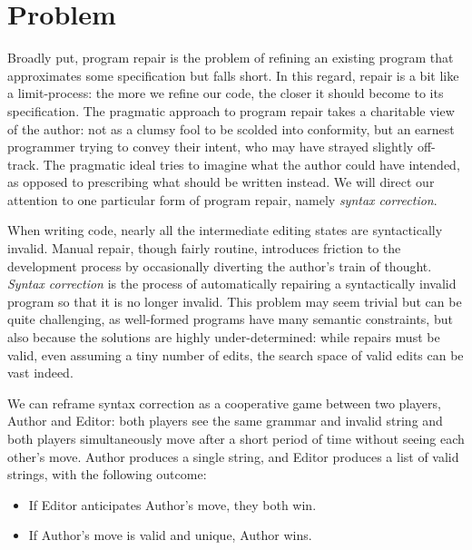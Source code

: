 \documentclass[sigplan,screen]{acmart}
\begin{document}
\section{Problem}


Broadly put, program repair is the problem of refining an existing program that approximates some specification but falls short. In this regard, repair is a bit like a limit-process: the more we refine our code, the closer it should become to its specification. The pragmatic approach to program repair takes a charitable view of the author: not as a clumsy fool to be scolded into conformity, but an earnest programmer trying to convey their intent, who may have strayed slightly off-track. The pragmatic ideal tries to imagine what the author could have intended, as opposed to prescribing what should be written instead. We will direct our attention to one particular form of program repair, namely \emph{syntax correction}.

When writing code, nearly all the intermediate editing states are syntactically invalid. Manual repair, though fairly routine, introduces friction to the development process by occasionally diverting the author's train of thought. \textit{Syntax correction} is the process of automatically repairing a syntactically invalid program so that it is no longer invalid. This problem may seem trivial but can be quite challenging, as well-formed programs have many semantic constraints, but also because the solutions are highly under-determined: while repairs must be valid, even assuming a tiny number of edits, the search space of valid edits can be vast indeed.

We can reframe syntax correction as a cooperative game between two players, Author and Editor: both players see the same grammar and invalid string and both players simultaneously move after a short period of time without seeing each other's move. Author produces a single string, and Editor produces a list of valid strings, with the following outcome:

\begin{itemize}
  \item If Editor anticipates Author's move, they both win.
  \item If Author's move is valid and unique, Author wins.
\end{itemize}
\end{document}
